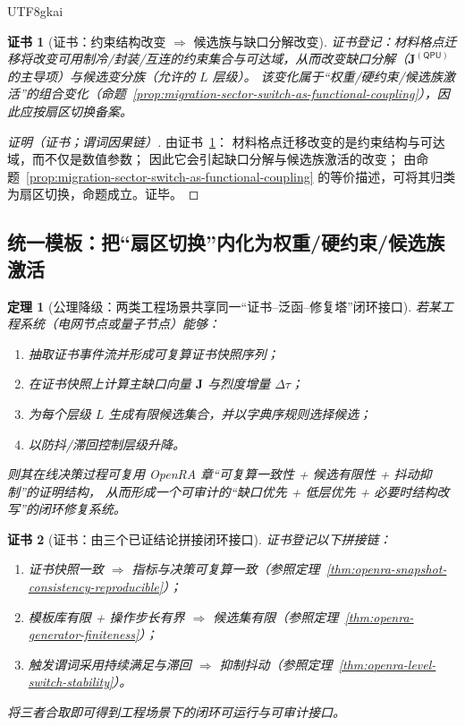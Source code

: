 \documentclass[12pt]{article}
\newtheorem{theorem}{定理}[section]
\newtheorem{Certificate}{证书}[section]
\begin{document}
\begin{CJK*}{UTF8}{gkai}
\begin{Certificate}[证书：约束结构改变 $\Rightarrow$ 候选族与缺口分解改变]
\label{cert:qpu-roomtemp-sc-as-sector-switch}
证书登记：材料格点迁移将改变可用制冷/封装/互连的约束集合与可达域，从而改变缺口分解（$\mathbf{J}^{(\mathsf{QPU})}$ 的主导项）与候选变分族（允许的 $L$ 层级）。
该变化属于“权重/硬约束/候选族激活”的组合变化（命题~\ref{prop:migration-sector-switch-as-functional-coupling}），因此应按扇区切换备案。
\end{Certificate}

\begin{proof}[证明（证书；谓词因果链）]
由证书~\ref{cert:qpu-roomtemp-sc-as-sector-switch}：
材料格点迁移改变的是约束结构与可达域，而不仅是数值参数；
因此它会引起缺口分解与候选族激活的改变；
由命题~\ref{prop:migration-sector-switch-as-functional-coupling} 的等价描述，可将其归类为扇区切换，命题成立。证毕。
\end{proof}

\subsection{统一模板：把“扇区切换”内化为权重/硬约束/候选族激活}
\label{sec:migration-unified-template}

\begin{theorem}[公理降级：两类工程场景共享同一“证书--泛函--修复塔”闭环接口]
\label{thm:migration-shared-closed-loop-interface}
若某工程系统（电网节点或量子节点）能够：
\begin{enumerate}
  \item 抽取证书事件流并形成可复算证书快照序列；
  \item 在证书快照上计算主缺口向量 $\mathbf{J}$ 与烈度增量 $\Delta\tau$；
  \item 为每个层级 $L$ 生成有限候选集合，并以字典序规则选择候选；
  \item 以防抖/滞回控制层级升降。
\end{enumerate}
则其在线决策过程可复用 OpenRA 章“可复算一致性 + 候选有限性 + 抖动抑制”的证明结构，
从而形成一个可审计的“缺口优先 + 低层优先 + 必要时结构改写”的闭环修复系统。
\end{theorem}

\begin{Certificate}[证书：由三个已证结论拼接闭环接口]
\label{cert:migration-shared-closed-loop-interface}
证书登记以下拼接链：
\begin{enumerate}
  \item 证书快照一致 $\Rightarrow$ 指标与决策可复算一致（参照定理~\ref{thm:openra-snapshot-consistency-reproducible}）；
  \item 模板库有限 + 操作步长有界 $\Rightarrow$ 候选集有限（参照定理~\ref{thm:openra-generator-finiteness}）；
  \item 触发谓词采用持续满足与滞回 $\Rightarrow$ 抑制抖动（参照定理~\ref{thm:openra-level-switch-stability}）。
\end{enumerate}
将三者合取即可得到工程场景下的闭环可运行与可审计接口。
\end{Certificate}


\end{CJK*}
\end{document}
